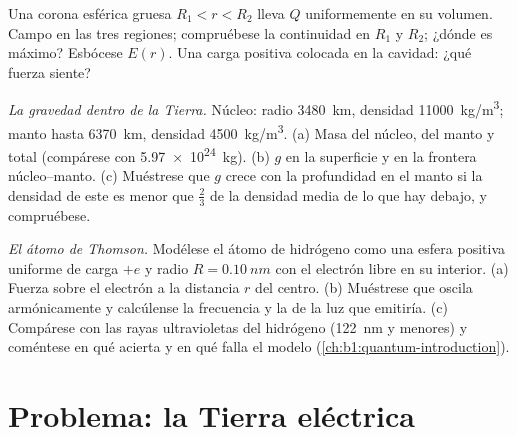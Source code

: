 \begin{exercise}[$\star\star\star$]\label{exo:b1:electrostatics-gauss:10}
Una corona esférica gruesa $R_1 < r < R_2$ lleva $Q$ uniformemente en su
volumen. Campo en las tres regiones; compruébese la continuidad en $R_1$ y
$R_2$; ¿dónde es máximo? Esbócese $E(r)$. Una carga positiva colocada en
la cavidad: ¿qué fuerza siente?
\end{exercise}

\begin{exercise}[$\star\star\star$]\label{exo:b1:electrostatics-gauss:11}
\emph{La gravedad dentro de la Tierra.} Núcleo: radio \qty{3480}{km},
densidad \qty{11000}{kg/m^3}; manto hasta \qty{6370}{km}, densidad \qty{4500}{kg/m^3}.
(a) Masa del núcleo, del manto y total (compárese con \qty{5.97e24}{kg}).
(b) $g$ en la superficie y en la frontera núcleo--manto. (c) Muéstrese que
$g$ crece con la profundidad en el manto si la densidad de este es menor
que $\tfrac23$ de la densidad media de lo que hay debajo, y compruébese.
\end{exercise}

\begin{exercise}[$\star\star\star$]\label{exo:b1:electrostatics-gauss:12}
\emph{El átomo de Thomson.} Modélese el átomo de hidrógeno como una
esfera positiva uniforme de carga $+e$ y radio $R = \qty{0.10}{nm}$ con el
electrón libre en su interior. (a) Fuerza sobre el electrón a la
distancia $r$ del centro. (b) Muéstrese que oscila armónicamente y
calcúlense la frecuencia y la  de la luz que emitiría.
(c) Compárese con las rayas ultravioletas del hidrógeno (\qty{122}{nm} y
menores) y coméntese en qué acierta y en qué falla el modelo (\cref{ch:b1:quantum-introduction}).
\end{exercise}

\section{Problema: la Tierra eléctrica}

